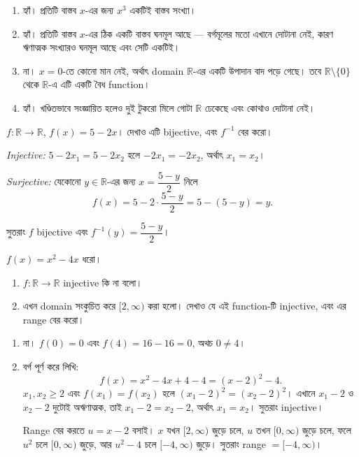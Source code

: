 \documentclass[11pt]{article}
\begin{document}
\begin{sol}
\begin{enumerate}
  \item হ্যাঁ। প্রতিটি বাস্তব $x$-এর জন্য $x^3$ একটিই বাস্তব সংখ্যা।
  \item হ্যাঁ। প্রতিটি বাস্তব $x$-এর ঠিক একটি বাস্তব ঘনমূল আছে --- বর্গমূলের
        মতো এখানে দোটানা নেই, কারণ ঋণাত্মক সংখ্যারও ঘনমূল আছে এবং সেটি
        একটিই।
  \item না। $x = 0$-তে কোনো মান নেই, অর্থাৎ domain $\mathbb{R}$-এর একটি
        উপাদান বাদ পড়ে গেছে। তবে $\mathbb{R} \setminus \{0\}$ থেকে
        $\mathbb{R}$-এ এটি একটি বৈধ function।
  \item হ্যাঁ। খণ্ডিতভাবে সংজ্ঞায়িত হলেও দুই টুকরো মিলে গোটা $\mathbb{R}$
        ঢেকেছে এবং কোথাও দোটানা নেই।
\end{enumerate}
\end{sol}

 $f \colon \mathbb{R} \to \mathbb{R}$, $f(x) = 5 - 2x$। দেখাও এটি
bijective, এবং $f^{-1}$ বের করো।

\begin{sol}
\emph{Injective:} $5 - 2x_1 = 5 - 2x_2$ হলে $-2x_1 = -2x_2$, অর্থাৎ
$x_1 = x_2$।

\emph{Surjective:} যেকোনো $y \in \mathbb{R}$-এর জন্য $x = \dfrac{5 - y}{2}$
নিলে
\[
  f(x) = 5 - 2 \cdot \frac{5-y}{2} = 5 - (5 - y) = y .
\]

সুতরাং $f$ bijective এবং $f^{-1}(y) = \dfrac{5 - y}{2}$।
\end{sol}

 $f(x) = x^2 - 4x$ ধরো।
\begin{enumerate}
  \item $f \colon \mathbb{R} \to \mathbb{R}$ injective কি না বলো।
  \item এখন domain সংকুচিত করে $[2, \infty)$ করা হলো। দেখাও যে এই
        function-টি injective, এবং এর range বের করো।
\end{enumerate}

\begin{sol}
\begin{enumerate}
  \item না। $f(0) = 0$ এবং $f(4) = 16 - 16 = 0$, অথচ $0 \neq 4$।
  \item বর্গ পূর্ণ করে লিখি:
        \[
          f(x) = x^2 - 4x + 4 - 4 = (x-2)^2 - 4 .
        \]
        $x_1, x_2 \geq 2$ এবং $f(x_1) = f(x_2)$ হলে $(x_1 - 2)^2 =
        (x_2 - 2)^2$। এখানে $x_1 - 2$ ও $x_2 - 2$ দুটোই অঋণাত্মক, তাই
        $x_1 - 2 = x_2 - 2$, অর্থাৎ $x_1 = x_2$। সুতরাং injective।

        Range বের করতে $u = x - 2$ বসাই। $x$ যখন $[2, \infty)$ জুড়ে চলে,
        $u$ তখন $[0, \infty)$ জুড়ে চলে, ফলে $u^2$ চলে $[0, \infty)$ জুড়ে,
        আর $u^2 - 4$ চলে $[-4, \infty)$ জুড়ে। সুতরাং range $= [-4, \infty)$।
\end{enumerate}
\end{sol}
\end{document}
